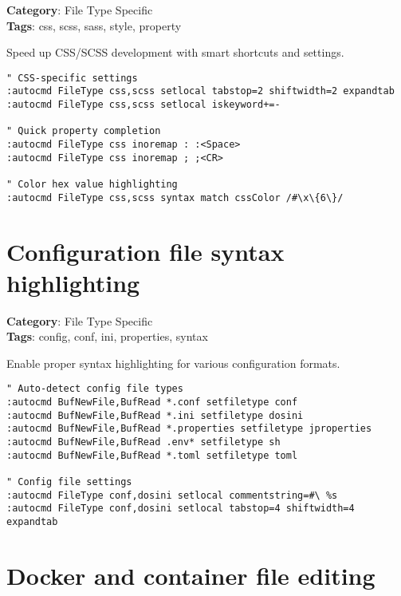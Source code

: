 {{{{{{\textbf{Category}: File Type Specific\\ \textbf{Tags}: css, scss, sass, style, property
\vspace{0.5cm}

Speed up CSS/SCSS development with smart shortcuts and settings.

\begin{Exa*}{}
\begin{Verbatim}[fontsize=\footnotesize, breaklines, breakanywhere]
" CSS-specific settings
:autocmd FileType css,scss setlocal tabstop=2 shiftwidth=2 expandtab
:autocmd FileType css,scss setlocal iskeyword+=-

" Quick property completion
:autocmd FileType css inoremap : :<Space>
:autocmd FileType css inoremap ; ;<CR>

" Color hex value highlighting
:autocmd FileType css,scss syntax match cssColor /#\x\{6\}/
\end{Verbatim}
\end{Exa*}

\section{Configuration file syntax highlighting}

\textbf{Category}: File Type Specific\\ \textbf{Tags}: config, conf, ini, properties, syntax
\vspace{0.5cm}

Enable proper syntax highlighting for various configuration formats.

\begin{Exa*}{}
\begin{Verbatim}[fontsize=\footnotesize, breaklines, breakanywhere]
" Auto-detect config file types
:autocmd BufNewFile,BufRead *.conf setfiletype conf
:autocmd BufNewFile,BufRead *.ini setfiletype dosini
:autocmd BufNewFile,BufRead *.properties setfiletype jproperties
:autocmd BufNewFile,BufRead .env* setfiletype sh
:autocmd BufNewFile,BufRead *.toml setfiletype toml

" Config file settings
:autocmd FileType conf,dosini setlocal commentstring=#\ %s
:autocmd FileType conf,dosini setlocal tabstop=4 shiftwidth=4 expandtab
\end{Verbatim}
\end{Exa*}

\section{Docker and container file editing}

}}}}}}
